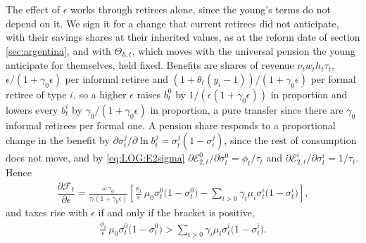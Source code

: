  The effect of $\epsilon$ works through retirees alone, since the young's terms do not depend on it. We sign it for a change that current retirees did not anticipate, with their savings shares at their inherited values, as at the reform date of section \ref{sec:argentina}, and with $\Theta_{h,t}$, which moves with the universal pension the young anticipate for themselves, held fixed. Benefits are shares of revenue $\nu_tw_th_t\tau_t$, $\epsilon/(1+\gamma_0\epsilon)$ per informal retiree and $(1+\theta_t(y_i-1))/(1+\gamma_0\epsilon)$ per formal retiree of type $i$, so a higher $\epsilon$ raises $b_t^0$ by $1/(\epsilon(1+\gamma_0\epsilon))$ in proportion and lowers every $b_t^i$ by $\gamma_0/(1+\gamma_0\epsilon)$ in proportion, a pure transfer since there are $\gamma_0$ informal retirees per formal one. A pension share responds to a proportional change in the benefit by $\partial\sigma_t^j/\partial\ln b_t^j = \sigma_t^j(1-\sigma_t^j)$, since the rest of consumption does not move, and by \eqref{eq:LOG:E2sigma} $\partial\mathcal{E}_{2,t}^0/\partial\sigma_t^0 = \phi_t/\tau_t$ and $\partial\mathcal{E}_{2,t}^i/\partial\sigma_t^i = 1/\tau_t$. Hence
\begin{align*}
    \dfrac{\partial \mathcal{F}_t}{\partial \epsilon} =\frac{\omega\,\gamma_0}{\tau_t(1+\gamma_0\epsilon)}\left[\frac{\phi_t}{\epsilon}\,\mu_0\sigma_t^0\big(1-\sigma_t^0\big)-\sum_{i>0}\gamma_i\mu_i\sigma_t^i\big(1-\sigma_t^i\big)\right],
\end{align*}
and taxes rise with $\epsilon$ if and only if the bracket is positive,
\begin{align}\label{eq:LOG:epsCondition}
    \frac{\phi_t}{\epsilon}\,\mu_0\sigma_t^0\big(1-\sigma_t^0\big) > \sum_{i>0}\gamma_i\mu_i\sigma_t^i\big(1-\sigma_t^i\big).
\end{align}
